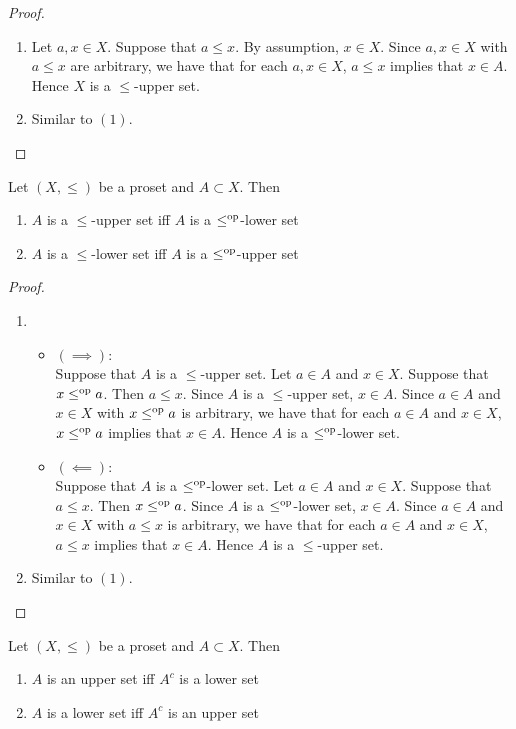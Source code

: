 \documentclass{book}
\begin{document}
	\begin{proof}\
		\begin{enumerate}
			\item Let $a, x \in X$. Suppose that $a \leq x$. By assumption, $x \in X$. Since $a,x \in X$ with $a \leq x$ are arbitrary, we have that for each $a,x \in X$, $a \leq x$ implies that $x \in A$. Hence $X$ is a $\leq$-upper set.
			\item Similar to $(1)$.
		\end{enumerate}
	\end{proof}
	
	\begin{ex} 
		Let $(X, \leq)$ be a proset and $A \subset X$. Then 
		\begin{enumerate}
			\item $A$ is a $\leq$-upper set iff $A$ is a $\leq^{\text{op}}$-lower set
			\item $A$ is a $\leq$-lower set iff $A$ is a $\leq^{\text{op}}$-upper set
		\end{enumerate}
	\end{ex}
	
	\begin{proof}\
		\begin{enumerate}
			\item 
			\begin{itemize}
				\item $(\implies)$: \\
				Suppose that $A$ is a $\leq$-upper set. Let $a \in A$ and $x \in X$. Suppose that $x \leq^{\text{op}} a$. Then $a \leq x$. Since $A$ is a $\leq$-upper set, $x \in A$. Since $a \in A$ and $x \in X$ with $x \leq^{\text{op}} a$ is arbitrary, we have that for each $a \in A$ and $x \in X$, $x \leq^{\text{op}} a$ implies that $x \in A$. Hence $A$ is a $\leq^{\text{op}}$-lower set. 
				\item $(\impliedby)$: \\
				Suppose that $A$ is a $\leq^{\text{op}}$-lower set. Let $a \in A$ and $x \in X$. Suppose that $a \leq x$. Then $x \leq^{\text{op}} a$. Since $A$ is a $\leq^{\text{op}}$-lower set, $x \in A$. Since $a \in A$ and $x \in X$ with $a \leq x$ is arbitrary, we have that for each $a \in A$ and $x \in X$, $a \leq x$ implies that $x \in A$. Hence $A$ is a $\leq$-upper set. 
			\end{itemize} 
			\item Similar to $(1)$.
		\end{enumerate}
	\end{proof}
	
	\begin{ex} 
		Let $(X, \leq)$ be a proset and $A \subset X$. Then 
		\begin{enumerate}
			\item $A$ is an upper set iff $A^c$ is a lower set
			\item $A$ is a lower set iff $A^c$ is an upper set
		\end{enumerate}
	\end{ex}
	
\end{document}
